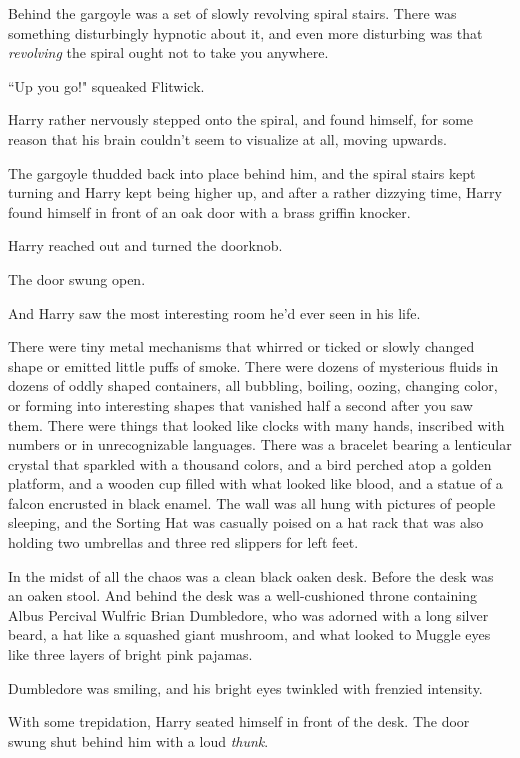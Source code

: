Behind the gargoyle was a set of slowly revolving spiral stairs. There was something disturbingly hypnotic about it, and even more disturbing was that \emph{revolving} the spiral ought not to take you anywhere.

``Up you go!" squeaked Flitwick.

Harry rather nervously stepped onto the spiral, and found himself, for some reason that his brain couldn't seem to visualize at all, moving upwards.

The gargoyle thudded back into place behind him, and the spiral stairs kept turning and Harry kept being higher up, and after a rather dizzying time, Harry found himself in front of an oak door with a brass griffin knocker.

Harry reached out and turned the doorknob.

The door swung open.

And Harry saw the most interesting room he'd ever seen in his life.

There were tiny metal mechanisms that whirred or ticked or slowly changed shape or emitted little puffs of smoke. There were dozens of mysterious fluids in dozens of oddly shaped containers, all bubbling, boiling, oozing, changing color, or forming into interesting shapes that vanished half a second after you saw them. There were things that looked like clocks with many hands, inscribed with numbers or in unrecognizable languages. There was a bracelet bearing a lenticular crystal that sparkled with a thousand colors, and a bird perched atop a golden platform, and a wooden cup filled with what looked like blood, and a statue of a falcon encrusted in black enamel. The wall was all hung with pictures of people sleeping, and the Sorting Hat was casually poised on a hat rack that was also holding two umbrellas and three red slippers for left feet.

In the midst of all the chaos was a clean black oaken desk. Before the desk was an oaken stool. And behind the desk was a well-cushioned throne containing Albus Percival Wulfric Brian Dumbledore, who was adorned with a long silver beard, a hat like a squashed giant mushroom, and what looked to Muggle eyes like three layers of bright pink pajamas.

Dumbledore was smiling, and his bright eyes twinkled with frenzied intensity.

With some trepidation, Harry seated himself in front of the desk. The door swung shut behind him with a loud \emph{thunk}.

